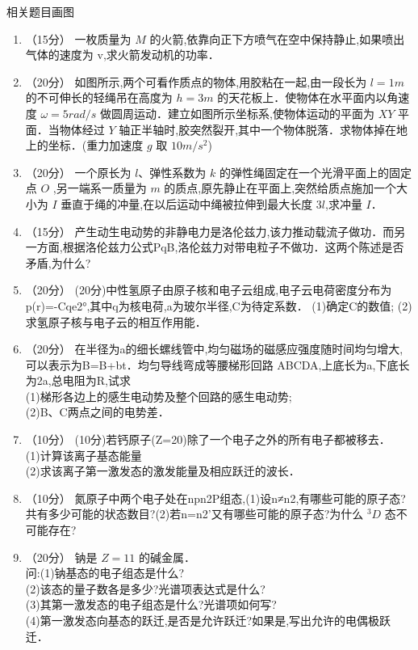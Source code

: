 
\begin{issues}
\issueTODO
相关题目画图
\end{issues}


\begin{enumerate}
\item （15分）
一枚质量为 $M$ 的火箭,依靠向正下方喷气在空中保持静止,如果喷出气体的速度为 $\mathrm v$,求火箭发动机的功率．
\item （20分）
如图所示,两个可看作质点的物体,用胶粘在一起,由一段长为 $l=1m$ 的不可伸长的轻绳吊在高度为 $h=3m$ 的天花板上．使物体在水平面内以角速度 $\omega=5rad/s$ 做圆周运动．建立如图所示坐标系,使物体运动的平面为 $XY$ 平面．当物体经过 $Y$ 轴正半轴时,胶突然裂开,其中一个物体脱落．求物体掉在地上的坐标．(重力加速度 $g$ 取 $10m/s^2$)
\item （20分）
一个原长为 $l$、弹性系数为 $k$ 的弹性绳固定在一个光滑平面上的固定点 $O$ ,另一端系一质量为 $m$ 的质点,原先静止在平面上,突然给质点施加一个大小为 $I$ 垂直于绳的冲量,在以后运动中绳被拉伸到最大长度 $3l$,求冲量 $I$．
\item （15分）
产生动生电动势的非静电力是洛伦兹力,该力推动载流子做功．而另一方面,根据洛伦兹力公式PqB,洛伦兹力对带电粒子不做功．这两个陈述是否矛盾,为什么?
\item （20分）
(20分)中性氢原子由原子核和电子云组成,电子云电荷密度分布为
p(r)=-Cqe2°,其中q为核电荷,a为玻尔半径,C为待定系数．
(1)确定C的数值;
(2)求氢原子核与电子云的相互作用能．
\item （20分）
在半径为a的细长螺线管中,均匀磁场的磁感应强度随时间均匀增大,可以表示为B=B+bt．均匀导线弯成等腰梯形回路 ABCDA,上底长为a,下底长为2a,总电阻为R,试求\\
(1)梯形各边上的感生电动势及整个回路的感生电动势;\\
(2)B、C两点之间的电势差．
\item （10分）
(10分)若钙原子(Z=20)除了一个电子之外的所有电子都被移去．\\
(1)计算该离子基态能量\\
(2)求该离子第一激发态的激发能量及相应跃迁的波长．
\item （10分）
氮原子中两个电子处在npn2P组态,(1)设n≠n2,有哪些可能的原子态?共有多少可能的状态数目?(2)若n=n2’又有哪些可能的原子态?为什么 $^{3}D$ 态不可能存在?
\item （20分） 
钠是 $Z=11$ 的碱金属．\\问:(1)钠基态的电子组态是什么?\\(2)该态的量子数各是多少?光谱项表达式是什么?\\(3)其第一激发态的电子组态是什么?光谱项如何写?\\(4)第一激发态向基态的跃迁,是否是允许跃迁?如果是,写出允许的电偶极跃迁．
\end{enumerate}